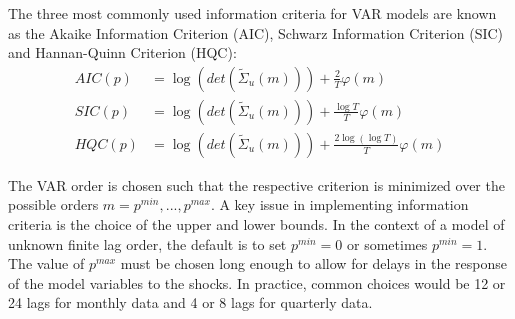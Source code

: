 \documentclass[a4paper]{scrartcl}
\begin{document}
The three most commonly used information criteria for VAR models are known as the Akaike Information Criterion (AIC), Schwarz Information Criterion (SIC) and Hannan-Quinn Criterion (HQC):
\begin{align*}
AIC(p)  &= \log(det(\tilde{\Sigma}_u(m))) + \frac{2}{T}\varphi(m)\\
SIC(p)  &= \log(det(\tilde{\Sigma}_u(m))) + \frac{\log T}{T}\varphi(m)\\
HQC(p)  &= \log(det(\tilde{\Sigma}_u(m))) + \frac{2\log (\log T)}{T}\varphi(m)
\end{align*}

The VAR order is chosen such that the respective criterion is minimized over the possible orders $m = p^{min},...,p^{max}$. A key issue in implementing information criteria is the choice of the upper and lower bounds. In the context of a model of unknown finite lag order, the default is to set $p^{min}=0$ or sometimes $p^{min} = 1$. The value of $p^{max}$ must be chosen long enough to allow for delays in the response of the model variables to the shocks. In practice, common choices would be 12 or 24 lags for monthly data and 4 or 8 lags for quarterly data.
\end{document}
